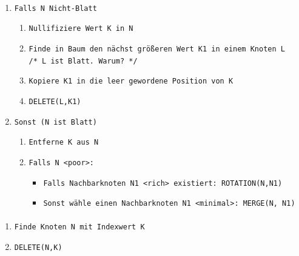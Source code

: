\begin{frame}{\insertsection}
\framesubtitle{\insertsubsection}
\begin{enumerate}
	\item \texttt{\small Falls N Nicht-Blatt}
	\begin{enumerate}
		\item \texttt{\small Nullifiziere Wert K in N}
		\pause
		\item \texttt{\small Finde in Baum den n\"achst gr\"o\ss eren Wert K1 in einem Knoten L
			\nl	$\quad$	/* L ist Blatt. Warum? */}
		\pause
		\item \texttt{\small Kopiere K1 in die leer gewordene Position von K}
		\pause
		\item \texttt{\small DELETE(L,K1)}		
	\end{enumerate}
	\pause
	\item \texttt{\small Sonst (N ist Blatt)}
	\begin{enumerate}
		\item \texttt{\small Entferne K aus N}
		\pause
		\item \texttt{\small Falls N <poor>:}
		\pause
		\begin{itemize}
			\item \texttt{\small Falls Nachbarknoten N1 <rich> existiert: ROTATION(N,N1)}
			\pause
			\item \texttt{\small Sonst wähle einen Nachbarknoten N1 <minimal>: MERGE(N, N1)}
		\end{itemize}			
	\end{enumerate}	
\end{enumerate}
\end{frame}

\begin{frame}{\insertsection}
\framesubtitle{\insertsubsection}
\begin{enumerate}
\item \texttt{\small Finde Knoten N mit Indexwert K}
\item \texttt{\small	DELETE(N,K)}
\end{enumerate}
\end{frame}

